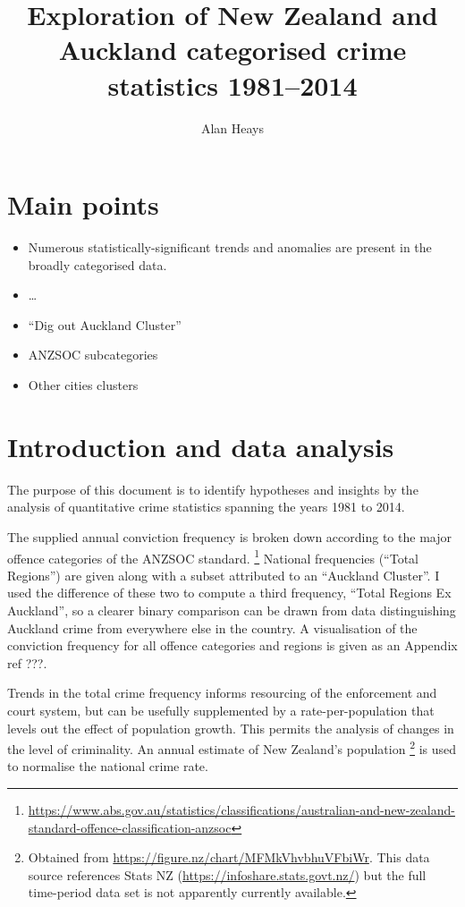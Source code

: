 \documentclass[onecolumn]{mysimple}
\title{Exploration of New Zealand and Auckland categorised crime statistics 1981–2014}
\author{Alan Heays}
\begin{document}
\maketitle

\section*{Main points}
\begin{itemize}
  \item Numerous statistically-significant trends and anomalies are present in the broadly categorised data.
  \item \dots
  \item ``Dig out Auckland Cluster''
  \item ANZSOC subcategories
  \item Other cities clusters
\end{itemize}

\section*{Introduction and data analysis}

The purpose of this document is to identify hypotheses and insights by  the analysis of quantitative crime statistics spanning the years 1981 to 2014.

The supplied annual conviction frequency is broken down according to the major offence categories of the ANZSOC standard. \footnote{\url{https://www.abs.gov.au/statistics/classifications/australian-and-new-zealand-standard-offence-classification-anzsoc}}
National frequencies (``Total Regions'') are given along with a subset attributed to an ``Auckland Cluster''.  
I used the difference of these two to compute a third frequency, ``Total Regions Ex Auckland'', so a clearer binary comparison can be drawn from data distinguishing Auckland crime from everywhere else in the country.
A visualisation of the conviction frequency for all offence categories and regions is given as an Appendix ref ???.

Trends in the total crime frequency informs resourcing of the enforcement and court system, but can be usefully supplemented by a rate-per-population that levels out the effect of population growth.
This permits the analysis of changes in the level of criminality.
An annual estimate of New Zealand's population \footnote{Obtained from \url{https://figure.nz/chart/MFMkVhvbhuVFbiWr}. This data source references Stats NZ (\url{https://infoshare.stats.govt.nz/}) but the full time-period data set is not apparently currently available.}  is used to normalise the national crime rate.
\end{document}
